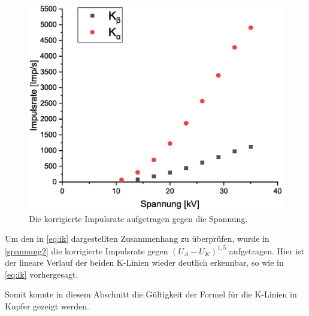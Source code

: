 \documentclass[
	a4paper,
	12pt,
	pagesize,
	ngerman
]{scrartcl}
\begin{document}
\begin{figure}[h!]
	\centering
	\includegraphics[scale = 0.6]{spannung.eps}
	\caption{Die korrigierte Impulsrate aufgetragen gegen die Spannung.}
	\label{spannung}
\end{figure}

 Um den in \cref{eq:ik} dargestellten Zusammenhang zu überprüfen, wurde in \cref{spannung2} die korrigierte Impulsrate gegen $(U_A - U_K)^{1,5}$ aufgetragen. Hier ist der lineare Verlauf der beiden K-Linien wieder deutlich erkennbar, so wie in \cref{eq:ik} vorhergesagt.
 
 Somit konnte in diesem Abschnitt die Gültigkeit der Formel für die K-Linien in Kupfer gezeigt werden.
\end{document}
